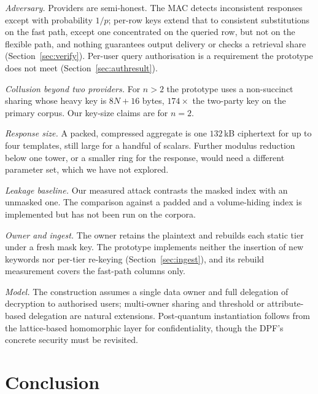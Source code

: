 \documentclass[a4paper,fleqn]{cas-sc}
\newif\ifauthorchecks
\newcommand{\authorcheck}[1]{\ifauthorchecks{\color{red}\textsf{[Authors: #1]}}\fi}
\begin{document}
\emph{Adversary.} Providers are semi-honest. The MAC detects inconsistent
responses except with probability $1/p$; per-row keys extend that to
consistent substitutions on the fast path, except one concentrated on the
queried row, but not on the flexible path, and nothing guarantees output
delivery or checks a retrieval share (Section~\ref{sec:verify}). Per-user query
authorisation is a requirement the prototype does not meet
(Section~\ref{sec:authresult}).

\emph{Collusion beyond two providers.} For $n>2$ the prototype uses a
non-succinct sharing whose heavy key is $8N+16$ bytes, $174\times$ the
two-party key on the primary corpus. Our key-size claims are for $n=2$.

\emph{Response size.} A packed, compressed aggregate is one $132$\,kB
ciphertext for up to four templates, still large for a handful of scalars.
Further modulus reduction below one tower, or a smaller ring for the response,
would need a different parameter set, which we have not explored.

\emph{Leakage baseline.} Our measured attack contrasts the masked index with an
unmasked one. The comparison against a padded and a volume-hiding index
\citep{kamara2019computationally,patel2019mitigating} is implemented but has
not been run on the corpora. \authorcheck{Run it; see
Section~\ref{sec:leakeval}.}

\emph{Owner and ingest.} The owner retains the plaintext and rebuilds each
static tier under a fresh mask key. The prototype implements neither the
insertion of new keywords nor per-tier re-keying (Section~\ref{sec:ingest}),
and its rebuild measurement covers the fast-path columns only.

\emph{Model.} The construction assumes a single data owner and full delegation
of decryption to authorised users; multi-owner sharing and threshold or
attribute-based delegation are natural extensions. Post-quantum instantiation
follows from the lattice-based homomorphic layer for confidentiality, though
the DPF's concrete security must be revisited.

\FloatBarrier
\section{Conclusion}
\label{sec:conclusion}
\end{document}
